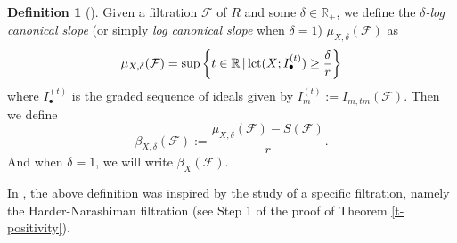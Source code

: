 \documentclass[12pt,reqno]{amsart}%
\newcommand{\bR}{{\mathbb{R} }}
\newcommand{\cF}{\mathcal{F}}
\theoremstyle{definition}
\newtheorem{defn}[thm]{Definition}
\theoremstyle{remark}
\newcommand{\lct}{{\rm lct}}
\begin{document}
\begin{defn}[{\cite[Def. 4.1]{XZ19}}]\label{d-filbeta}
Given a filtration $\cF$ of $R$ and some $\delta\in\bR_+$, we define the \emph{$\delta$-log canonical slope} (or simply \emph{log canonical slope} when $\delta=1$) $\mu_{X,\delta}(\cF)$ as
\begin{equation}
\mu_{X,\delta}(\cF) = \sup \left\{t\in\bR\,|\,\lct(X;I^{(t)}_\bullet)\ge \frac{\delta}{r}\right\}
\end{equation}
where $I^{(t)}_\bullet$ is the graded sequence of ideals given by $I^{(t)}_m := I_{m, tm}(\cF)$. Then we define $$\beta_{X,\delta}(\cF):= \frac{\mu_{X,\delta}(\cF)-S(\cF)}{r}.$$
And when $\delta=1$, we will write $\beta_X(\cF)$.  
\end{defn}

In \cite{XZ19}, the above definition was inspired by the study of a specific filtration, namely the Harder-Narashiman filtration (see Step 1 of the proof of Theorem \ref{t-positivity}). 
\end{document}
